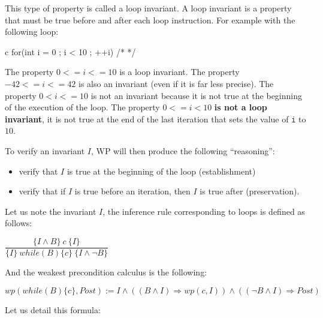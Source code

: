 \documentclass[middle]{zmdocument}
\begin{document}
This type of property is called a loop invariant. A loop invariant is a
property that must be true before and after each loop instruction. For
example with the following loop:



\begin{CodeBlock}{c}
for(int i = 0 ; i < 10 ; ++i){ /* */ }
\end{CodeBlock}



The property $0 <= i <= 10$ is a loop invariant. The property
$-42 <= i <= 42$ is also an invariant (even if it is far less
precise). The property $0 < i <= 10$ is not an invariant because it is
not true at the beginning of the execution of the loop. The property
$0 <= i < 10$ \textbf{is not a loop invariant}, it is not true at the
end of the last iteration that sets the value of \texttt{i} to $10$.

To verify an invariant $I$, WP will then produce the following
``reasoning'':

\begin{itemize}
\item
  verify that $I$ is true at the beginning of the loop (establishment)
\item
  verify that if $I$ is true before an iteration, then $I$ is true
  after (preservation).
\end{itemize}


Let us note the invariant $I$, the inference rule corresponding to
loops is defined as follows:

\begin{center}
$\dfrac{\{I \wedge B \}\ c\ \{I\}}{\{I\}\ while(B)\{c\}\ \{I \wedge \neg B\}}$
\end{center}

And the weakest precondition calculus is the following:

\begin{center}
$wp(while (B) \{ c \}, Post) := I \wedge ((B \wedge I) \Rightarrow wp(c, I)) \wedge ((\neg B \wedge I) \Rightarrow Post)$
\end{center}

Let us detail this formula:
\end{document}
